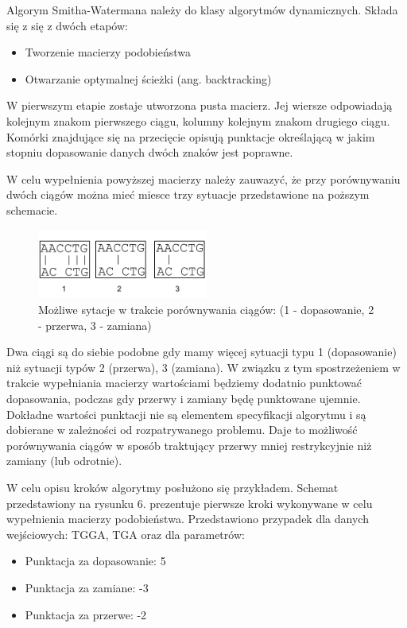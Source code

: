 \documentclass[a4paper,12pt]{article}
\newenvironment{lista}{
\begin{itemize}
  \setlength{\itemsep}{1pt}
  \setlength{\parskip}{0pt}
  \setlength{\parsep}{0pt}
}{\end{itemize}}
\begin{document}
Algorym Smitha-Watermana należy do klasy algorytmów dynamicznych. Składa się z się z dwóch etapów:
\begin{lista}
 \item Tworzenie macierzy podobieństwa
\item Otwarzanie optymalnej ścieżki (ang. backtracking)
\end{lista}

W pierwszym etapie zostaje utworzona pusta macierz. Jej wiersze odpowiadają kolejnym znakom pierwszego ciągu, kolumny kolejnym znakom drugiego ciągu. Komórki znajdujące się na przecięcie opisują punktacje określającą w jakim stopniu dopasowanie danych dwóch znaków jest poprawne. 

W celu wypełnienia powyższej macierzy należy zauwazyć, że przy porównywaniu dwóch ciągów można mieć miesce trzy sytuacje przedstawione na poższym schemacie.

\begin{figure}[H]
  \vspace{5pt}
  \centering
  \begin{center}
  \includegraphics[width=0.5\textwidth]{images/TypySytuacjiPrzyDopasowaniu.png}
  \end{center}
  \caption{Możliwe sytacje w trakcie porównywania ciągów: (1 - dopasowanie, 2 - przerwa, 3 - zamiana)}
 \end{figure}


Dwa ciągi są do siebie podobne gdy mamy więcej sytuacji typu 1 (dopasowanie) niż sytuacji typów 2 (przerwa), 3 (zamiana). W związku z tym spostrzeżeniem w trakcie wypełniania macierzy wartościami będziemy dodatnio punktować dopasowania, podczas gdy przerwy i zamiany będę punktowane ujemnie. Dokładne wartości punktacji nie są elementem specyfikacji algorytmu i są dobierane w zależności od rozpatrywanego problemu. Daje to możliwość porównywania ciągów w sposób traktujący przerwy mniej restrykcyjnie niż zamiany (lub odrotnie). 

W celu opisu kroków algorytmy posłużono się przykładem. Schemat przedstawiony na rysunku 6. prezentuje pierwsze kroki wykonywane w celu wypełnienia macierzy podobieństwa. Przedstawiono przypadek dla danych wejściowych: TGGA, TGA oraz dla parametrów:
\begin{lista}
\item Punktacja za dopasowanie: 5
\item Punktacja za zamiane: -3
\item Punktacja za przerwe: -2
\end{lista}
\end{document}
